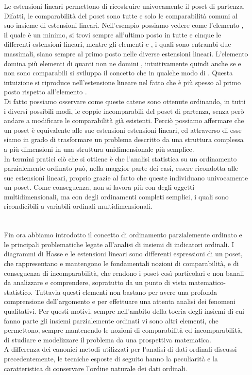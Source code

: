 \documentclass[12pt]{article}
\begin{document}
Le estensioni lineari permettono di ricostruire univocamente il poset di partenza. Difatti, le comparabilità del poset sono tutte e solo le 
comparabilità comuni al suo insieme di estensioni lineari. Nell'esempio possiamo vedere come l'elemento , il quale è un minimo, si trovi
sempre all'ultimo posto in tutte e cinque le differenti estensioni lineari, mentre gli elementi  e , i quali sono entrambi due
massimali, siano sempre al primo posto nelle diverse estensioni lineari. L'elemento  domina più elementi di quanti non ne domini 
, intuitivamente quindi anche se  e  non sono comparabili si sviluppa il concetto che   in qualche modo
di . Questa intuizione si riproduce nell'estensione lineare nel fatto che  è più spesso al primo posto rispetto all'elemento . \\
Di fatto possiamo osservare come queste catene sono ottenute ordinando, in tutti i diversi possibili modi, le coppie incomparabili del poset
di partenza, senza però andare a modificare le comparabilità già esistenti.
Perciò possiamo affermare che un poset è equivalente alle sue estensioni estensioni
lineari, ed attraverso di esse siamo in grado di trasformare un problema descritto da una struttura complessa a più dimensioni in una
struttura unidimensionale più semplice. \\
In termini pratici ciò che si ottiene è che l'analisi statistica su un ordinamento parzialemente ordinato può, nella maggior parte dei casi,
essere ricondotta alle sue estensioni lineari, proprio grazie al fatto che queste individuano univocamente un poset. Come conseguenza, non si 
lavora più con degli oggetti multidimensionali, ma con degli ordinamenti completi semplici, i quali sono ricondicibili a variabili ordinali
multidimensionali. \\
\\
\\
Fin ora abbiamo introdotto il concetto di ordinamento parzialemente ordinato e le principali problematiche legate all'analisi di insiemi
di indicatori ordinali. I diagrammi di Hasse e le estensioni lineari sono differenti espressioni di un poset, che rappresentano e mantengono le 
fondamentali nozioni di comparabilità,  e di conseguenza di incomparabilità, che rendono i poset così particolari e non banali da analizzare e 
comprendere, sopratutto da un punto di vista matematico-statistico. Tuttavia questi elementi non bastano per avere una profonda comprensione
dell'argomento e
per effettuare una attenta analisi dei fenomeni qualitativi. Per questi motivi, sempre nell'ambito della toeria degli insiemi di cui fanno 
parte gli insiemi parzialemente ordinati vi sono altri elementi, che permettono, sempre mantenendo le nozioni di comparabilità ed incomparabilità,
di studiare e modelizzare il problema da una prospettiva matematica. \\
A differenza dei canonici metodi utilizzati per l'analisi di dati ordinali discussi precedentemente, le tecniche esposte di seguito hanno 
la peculiarità e la caratteristica di conservare l'ordine naturale dei dati ordinali. \\
\end{document}

